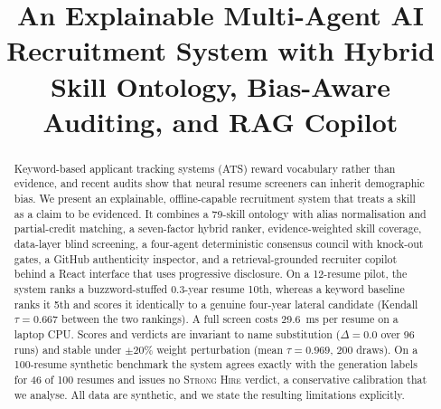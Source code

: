 \documentclass[conference]{IEEEtran}
\newcommand{\verd}[1]{\textsc{#1}}
\newcommand{\Sstrong}{\verd{Strong Hire}}
\begin{document}
\title{An Explainable Multi-Agent AI Recruitment System with Hybrid Skill Ontology, Bias-Aware Auditing, and RAG Copilot}

\author{
\and
{}
\and
{}
}

\maketitle

\begin{abstract}
Keyword-based applicant tracking systems (ATS) reward vocabulary rather than evidence, and recent audits show that neural resume screeners can inherit demographic bias. We present an explainable, offline-capable recruitment system that treats a skill as a claim to be evidenced. It combines a 79-skill ontology with alias normalisation and partial-credit matching, a seven-factor hybrid ranker, evidence-weighted skill coverage, data-layer blind screening, a four-agent deterministic consensus council with knock-out gates, a GitHub authenticity inspector, and a retrieval-grounded recruiter copilot behind a React interface that uses progressive disclosure. On a 12-resume pilot, the system ranks a buzzword-stuffed 0.3-year resume 10th, whereas a keyword baseline ranks it 5th and scores it identically to a genuine four-year lateral candidate (Kendall $\tau=0.667$ between the two rankings). A full screen costs 29.6~ms per resume on a laptop CPU. Scores and verdicts are invariant to name substitution ($\Delta=0.0$ over 96 runs) and stable under $\pm20\%$ weight perturbation (mean $\tau=0.969$, 200 draws). On a 100-resume synthetic benchmark the system agrees exactly with the generation labels for 46 of 100 resumes and issues no \Sstrong{} verdict, a conservative calibration that we analyse. All data are synthetic, and we state the resulting limitations explicitly.
\end{abstract}
\end{document}
